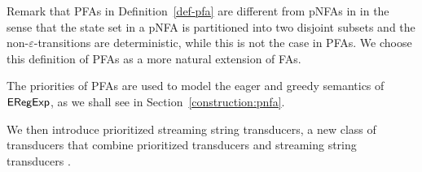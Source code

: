 \begin{remark}
Remark that PFAs in Definition~\ref{def-pfa} are different from pNFAs in \cite{BM17} in the sense that the state set in a pNFA is partitioned into two disjoint subsets and the non-$\varepsilon$-transitions are deterministic, while this is not the case in PFAs. We choose this definition of PFAs as a more natural extension of FAs. 
\end{remark}

The priorities of PFAs are used to model the eager and greedy semantics of ${\sf ERegExp}$, as we shall see in Section~\ref{construction:pnfa}.



We then introduce prioritized streaming string transducers, a new class of transducers that combine prioritized transducers \cite{BM17} %
and streaming string transducers \cite{AC10,AD11}.
  
